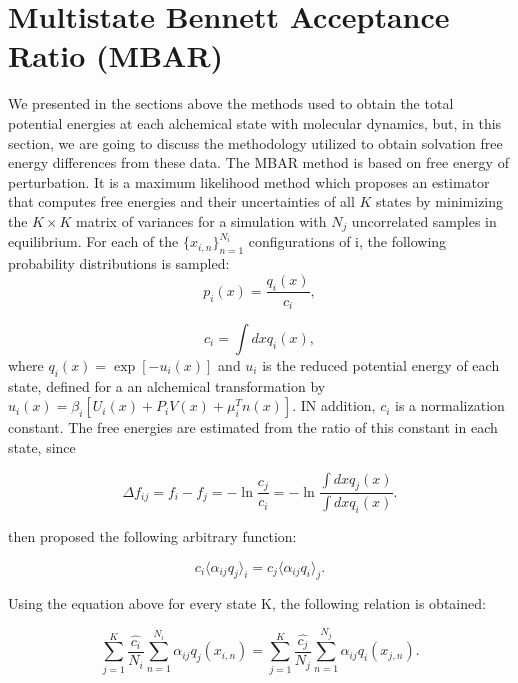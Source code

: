 \section{Multistate Bennett Acceptance Ratio (MBAR)}\label{mbar}

We presented in the sections above the methods used to obtain the total potential energies at each alchemical state with molecular dynamics, but, in this section, we are going to discuss the methodology utilized to obtain solvation free energy differences from these data. The MBAR method \cite{mbar} is based on free energy of perturbation. It is a maximum likelihood method which proposes an estimator that computes free energies and their uncertainties of all $K$ states  by minimizing the $K \times K$ matrix of variances for a simulation with $N_{j}$ uncorrelated samples in equilibrium. For each of the $\lbrace x_{i,n } \rbrace ^{N_{i}}_{n=1 }$ configurations of i, the following probability distributions is sampled:
\begin{equation}
p_{i}(x) = \frac{q_{i}(x)}{c_{i}},
\end{equation}

\begin{equation}
c_{i} = \int dx q_{i}(x),
\end{equation}
where $q_{i}(x)=\exp[-u_{i}(x)]$ and $u_{i}$ is the reduced potential energy of each state, defined for a an alchemical transformation by $u_{i} (x)= \beta_{i} [U_{i}(x)+P_{i}V(x) + \mu _{i}^{T}n(x)]$. IN addition, $c_{i}$ is a normalization constant.  The free energies are estimated from the ratio of this constant in each state, since

\begin{equation}
\Delta f_{ij} = f_{i} - f_{j} = - \ln \frac{c_{j}}{c_{i}}  = -\ln \frac{\int dx q_{j}(x)}{\int dx q_{i}(x)} .
\label{eqn:mbar1}
\end{equation}

 then proposed the following arbitrary function:

\begin{equation}
c_{i} \langle \alpha _{ij} q_{j} \rangle _{i}  =  c_{j} \langle \alpha _{ij} q_{i} \rangle _{j} .
\end{equation}

Using the equation above for every state  K, the following relation is obtained:

\begin{equation}
\label{eq:mbar1}
\sum_{j=1}^{K} \frac{\hat{c_{i}}}{N_{i}} \sum_{n=1}^{N_{i}} \alpha _{ij} q_{j} (x_{i,n}) =  \sum_{j=1}^{K} \frac{\hat{c_{j}}}{N_{j}} \sum_{n=1}^{N_{j}} \alpha _{ij} q_{i} (x_{j,n}) .
\end{equation}

